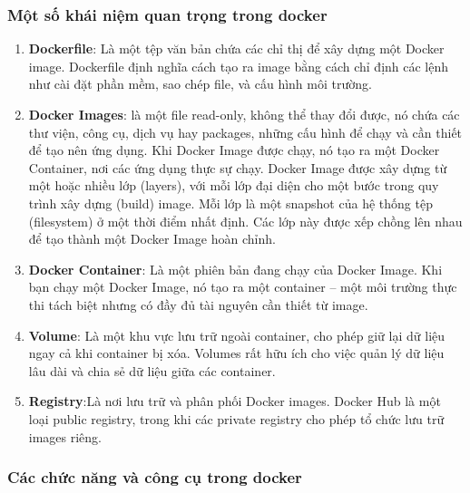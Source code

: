 \documentclass[a4paper,12pt]{article}
\begin{document}
\subsubsection{ Một số khái niệm quan trọng trong docker}
\begin{enumerate}

\begin{figure}[htbp]
    \centering
    \texttt{[image: image/k8s and docker/k8s note/cach\_thuc\_hoat\_dong\_cua\_docker\_2\_6fb96c2e71.jpg]}
    \caption{Docker work}
    \label{}
\end{figure}



    \item \textbf{Dockerfile}: Là một tệp văn bản chứa các chỉ thị để xây dựng một Docker image. Dockerfile định nghĩa cách tạo ra image bằng cách chỉ định các lệnh như cài đặt phần mềm, sao chép file, và cấu hình môi trường.
    \item \textbf{Docker Images}: là một file read-only, không thể thay đổi được, nó chứa các thư viện, công cụ, dịch vụ hay packages, những cấu hình để chạy và cần thiết để tạo nên ứng dụng.  Khi Docker Image được chạy, nó tạo ra một Docker Container, nơi các ứng dụng thực sự chạy. Docker Image được xây dựng từ một hoặc nhiều lớp (layers), với mỗi lớp đại diện cho một bước trong quy trình xây dựng (build) image. Mỗi lớp là một snapshot của hệ thống tệp (filesystem) ở một thời điểm nhất định. Các lớp này được xếp chồng lên nhau để tạo thành một Docker Image hoàn chỉnh.
    \item \textbf{Docker Container}: Là một phiên bản đang chạy của Docker Image. Khi bạn chạy một Docker Image, nó tạo ra một container – một môi trường thực thi tách biệt nhưng có đầy đủ tài nguyên cần thiết từ image.
    \item \textbf{Volume}: Là một khu vực lưu trữ ngoài container, cho phép giữ lại dữ liệu ngay cả khi container bị xóa. Volumes rất hữu ích cho việc quản lý dữ liệu lâu dài và chia sẻ dữ liệu giữa các container.
    \item \textbf{Registry}:Là nơi lưu trữ và phân phối Docker images. Docker Hub là một loại public registry, trong khi các private registry cho phép tổ chức lưu trữ images riêng.
\end{enumerate}

\subsubsection{ Các chức năng và công cụ trong docker}
\end{document}
